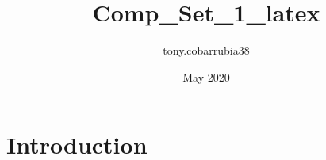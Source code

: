 \documentclass{article}
\title{Comp_Set_1_latex}
\author{tony.cobarrubia38 }
\date{May 2020}
\begin{document}
\maketitle

\section{Introduction}
\end{document}
